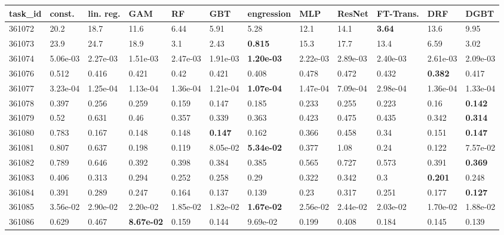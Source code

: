 \begin{table}[ht!]
\centering
\begingroup\footnotesize
\begin{tabular}{llllllllllll}
  \hline
\hline
task\_id & const. & lin. reg. & GAM & RF & GBT & engression & MLP & ResNet & FT-Trans. & DRF & DGBT \\ 
  \hline
361072 & 20.2 & 18.7 & 11.6 & 6.44 & 5.91 & 5.28 & 12.1 & 14.1 & \textbf{3.64} & 13.6 & 9.95 \\ 
  361073 & 23.9 & 24.7 & 18.9 & 3.1 & 2.43 & \textbf{0.815} & 15.3 & 17.7 & 13.4 & 6.59 & 3.02 \\ 
  361074 & 5.06e-03 & 2.27e-03 & 1.51e-03 & 2.47e-03 & 1.91e-03 & \textbf{1.20e-03} & 2.22e-03 & 2.89e-03 & 2.40e-03 & 2.61e-03 & 2.09e-03 \\ 
  361076 & 0.512 & 0.416 & 0.421 & 0.42 & 0.421 & 0.408 & 0.478 & 0.472 & 0.432 & \textbf{0.382} & 0.417 \\ 
  361077 & 3.23e-04 & 1.25e-04 & 1.13e-04 & 1.36e-04 & 1.21e-04 & \textbf{1.07e-04} & 1.47e-04 & 7.09e-04 & 2.98e-04 & 1.36e-04 & 1.33e-04 \\ 
  361078 & 0.397 & 0.256 & 0.259 & 0.159 & 0.147 & 0.185 & 0.233 & 0.255 & 0.223 & 0.16 & \textbf{0.142} \\ 
  361079 & 0.52 & 0.631 & 0.46 & 0.357 & 0.339 & 0.363 & 0.423 & 0.475 & 0.435 & 0.342 & \textbf{0.314} \\ 
  361080 & 0.783 & 0.167 & 0.148 & 0.148 & \textbf{0.147} & 0.162 & 0.366 & 0.458 & 0.34 & 0.151 & \textbf{0.147} \\ 
  361081 & 0.807 & 0.637 & 0.198 & 0.119 & 8.05e-02 & \textbf{5.34e-02} & 0.377 & 1.08 & 0.24 & 0.122 & 7.57e-02 \\ 
  361082 & 0.789 & 0.646 & 0.392 & 0.398 & 0.384 & 0.385 & 0.565 & 0.727 & 0.573 & 0.391 & \textbf{0.369} \\ 
  361083 & 0.406 & 0.313 & 0.294 & 0.252 & 0.258 & 0.29 & 0.322 & 0.342 & 0.3 & \textbf{0.201} & 0.248 \\ 
  361084 & 0.391 & 0.289 & 0.247 & 0.164 & 0.137 & 0.139 & 0.23 & 0.317 & 0.251 & 0.177 & \textbf{0.127} \\ 
  361085 & 3.56e-02 & 2.90e-02 & 2.20e-02 & 1.85e-02 & 1.82e-02 & \textbf{1.67e-02} & 2.56e-02 & 2.44e-02 & 2.03e-02 & 1.70e-02 & 1.88e-02 \\ 
  361086 & 0.629 & 0.467 & \textbf{8.67e-02} & 0.159 & 0.144 & 9.69e-02 & 0.199 & 0.408 & 0.184 & 0.145 & 0.139 \\ 

\end{tabular}
\end{table}
